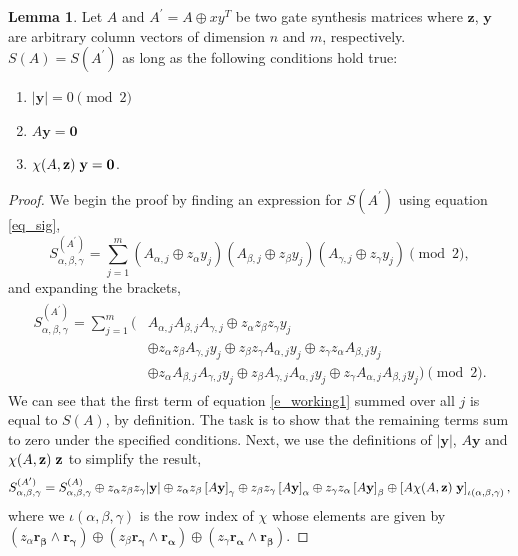 \documentclass[titlepage]{article}
\theoremstyle{definition}
\theoremstyle{problem}
\theoremstyle{lemma}
\newtheorem{lemma}{Lemma}[section]
\begin{document}
		\theoremstyle{lemma}
		\begin{lemma}{}
			\label{lem1}
			Let $A$ and $A^\prime = A \oplus xy^T$ be two gate synthesis matrices where $\mathbf{z}$, $\mathbf{y}$ are arbitrary column vectors of dimension $n$ and $m$, respectively. $S(A) = S(A^\prime)$ as long as the following conditions hold true:
			\begin{enumerate}
				\item $|\mathbf{y}| = 0\pmod{2}$
				\item $A\mathbf{y} = \mathbf{0}$
				\item $\chi(A,\mathbf{z})\hspace{1mm}\mathbf{y} = \mathbf{0}$.
			\end{enumerate}
		\end{lemma}
		\begin{proof}
			We begin the proof by finding an expression for $S(A^\prime)$ using equation \ref{eq_sig},
			\begin{equation}
			S^{(A^\prime)}_{\alpha,\beta,\gamma} = \sum_{j=1}^{m}\left(A_{\alpha,j}\oplus z_\alpha y_j\right)\left(A_{\beta,j}\oplus z_\beta y_j\right)\left(A_{\gamma,j}\oplus z_\gamma y_j\right) \pmod{2},
			\end{equation}
			and expanding the brackets,
			\begin{align}
			\label{e_working1}
			\begin{split}
			S^{(A^\prime)}_{\alpha,\beta,\gamma} = \sum_{j=1}^{m}(&A_{\alpha,j}A_{\beta,j}A_{\gamma,j} \oplus z_\alpha z_\beta z_\gamma y_j  \\			
			&\oplus z_\alpha z_\beta A_{\gamma,j} y_j \oplus z_\beta z_\gamma A_{\alpha,j} y_j \oplus z_\gamma z_\alpha A_{\beta,j} y_j \\
			&\oplus z_\alpha A_{\beta,j} A_{\gamma,j} y_j \oplus z_\beta A_{\gamma,j} A_{\alpha,j} y_j \oplus z_\gamma A_{\alpha,j} A_{\beta,j} y_j) \pmod{2}.
			\end{split}
			\end{align}
			We can see that the first term of equation \ref{e_working1} summed over all $j$ is equal to $S(A)$, by definition. The task is to show that the remaining terms sum to zero under the specified conditions. Next, we use the definitions of $|\mathbf{y}|$, $A\mathbf{y}$ and $\chi(A,\mathbf{z})\hspace{1mm}\mathbf{z}$ to simplify the result,
			\begin{equation}
			S^{(A^\prime)}_{\alpha,\beta,\gamma} = S^{(A)}_{\alpha,\beta,\gamma} \oplus z_\alpha z_\beta z_\gamma |\mathbf{y}| \oplus z_\alpha z_\beta \left[A\mathbf{y}\right]_\gamma \oplus z_\beta z_\gamma \left[A\mathbf{y}\right]_\alpha \oplus z_\gamma z_\alpha \left[A\mathbf{y}\right]_\beta \oplus \left[A\chi(A,\mathbf{z})\hspace{1mm}\mathbf{y}\right]_{\iota(\alpha,\beta,\gamma)},
			\end{equation}
			where we $\iota(\alpha,\beta,\gamma)$ is the row index of $\chi$ whose elements are given by $(z_\alpha\mathbf{r_\beta}\wedge\mathbf{r_\gamma})\oplus (z_\beta\mathbf{r_\gamma}\wedge\mathbf{r_\alpha})\oplus (z_\gamma\mathbf{r_\alpha}\wedge\mathbf{r_\beta})$.
			

\end{proof}
\end{document}
